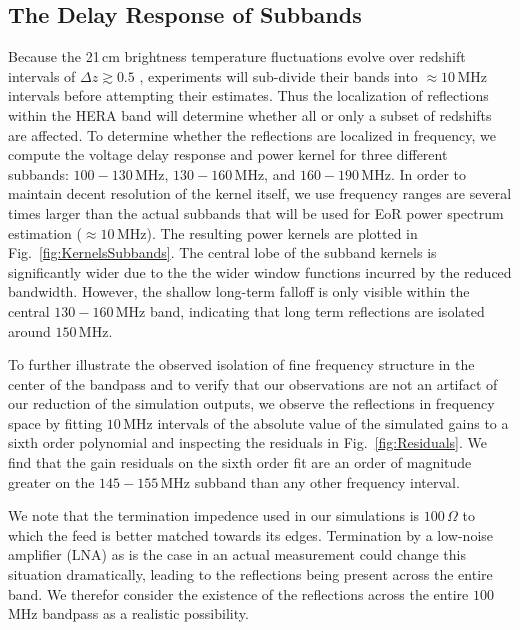\documentclass[twocolumn]{emulateapj}
\begin{document}
\subsection{The Delay Response of Subbands}\label{ssec:Subbands}
Because the 21\,cm brightness temperature fluctuations evolve over redshift intervals of $\Delta z \gtrsim 0.5$ \citep{Zaldarriaga:2004}, experiments will sub-divide their bands into $\approx 10$\,MHz intervals before attempting their estimates. Thus the localization of reflections within the HERA band will determine whether all or only a subset of redshifts are affected. To determine whether the reflections are localized in frequency, we compute the voltage delay response and power kernel for three different subbands: $100-130$\,MHz, $130-160$\,MHz, and $160-190$\,MHz. In order to maintain decent resolution of the kernel itself, we use frequency ranges are several times larger than the actual subbands that will be used for EoR power spectrum estimation ($\approx 10$\,MHz). The resulting power kernels are plotted in Fig.~\ref{fig:KernelsSubbands}. The central lobe of the subband kernels is significantly wider due to the the wider window functions incurred by the reduced bandwidth. However, the shallow long-term falloff is only visible within the central $130-160$\,MHz band, indicating that long term reflections are isolated around $150$\,MHz.

To further illustrate the observed isolation of fine frequency structure in the center of the bandpass and to verify that our observations are not an artifact of our reduction of the simulation outputs, we observe the reflections in frequency space by fitting $10$\,MHz intervals of the absolute value of the simulated gains to a sixth order polynomial and inspecting the residuals in Fig.~\ref{fig:Residuals}. We find that the gain residuals on the sixth order fit are an order of magnitude greater on the $145-155$\,MHz subband than  any other frequency interval. 

We note that the termination impedence used in our simulations is $100$\,$\Omega$ to which the feed is better matched towards its edges. Termination by a low-noise amplifier (LNA) as is the case in an actual measurement could change this situation dramatically, leading to the reflections being present across the entire band. We therefor consider the existence of the reflections across the entire $100$\,MHz bandpass as a realistic possibility.
\end{document}
